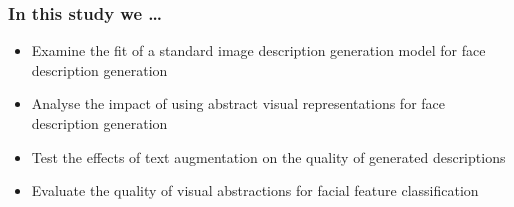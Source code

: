 \documentclass[aspectratio=1610]{beamer} %
\begin{document}
\begin{frame}
\frametitle{In this study we \ldots}
\begin{itemize}
	\item Examine the fit of a standard image description generation model for face description generation
	\pause
	\item Analyse the impact of using abstract visual representations for face description generation
	\pause
	\item Test the effects of text augmentation on the quality of generated descriptions
	\pause
	\item Evaluate the quality of visual abstractions for facial feature classification
\end{itemize}
\end{frame}
\end{document}
